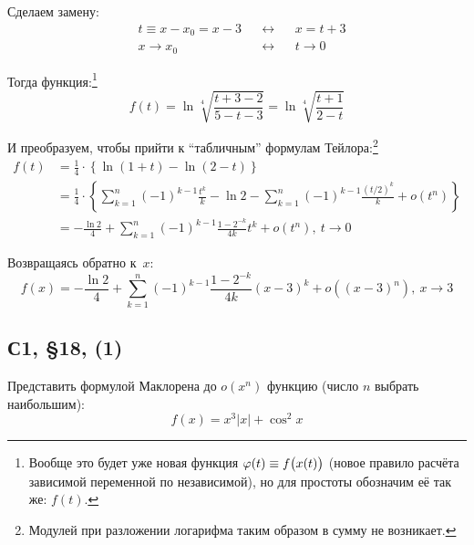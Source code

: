 \documentclass[a4paper,12pt]{article}
\begin{document}
  \begin{solution}
    Сделаем замену:
    \[
      \begin{aligned}
        &t \equiv x - x_0 = x - 3 & &\leftrightarrow & &x = t + 3\\
        &x \to x_0 & &\leftrightarrow & &t \to 0
      \end{aligned}
    \]
    
    Тогда функция:\footnote{
      Вообще это будет уже новая функция $\phi(t) \hm\equiv f\bigl(x(t)\bigr)$ (новое правило расчёта зависимой переменной по независимой), но для простоты обозначим её так же: $f(t)$.
    }
    \[
      f(t) = \ln{\sqrt[4]{\frac{t + 3 - 2}{5 - t - 3}}}
        = \ln{\sqrt[4]{\frac{t + 1}{2 - t}}}
    \]
    
    И преобразуем, чтобы прийти к ``табличным'' формулам Тейлора:\footnote{
      Модулей при разложении логарифма таким образом в сумму не возникает.
    }
    \begin{equation*}
    \begin{split}
      f(t) &= \frac{1}{4} \cdot \left\{
        \ln{(1 + t)} - \ln{(2 - t)}
      \right\}\\
      &= \frac{1}{4} \cdot \left\{
        \sum_{k = 1}^n (-1)^{k - 1} \frac{t^k}{k} - \ln 2 - \sum_{k = 1}^n (-1)^{k - 1} \frac{(t/2)^k}{k} + o(t^n)
      \right\}\\
      &= -\frac{\ln 2}{4} + \sum_{k = 1}^n (-1)^{k - 1} \frac{1 - 2^{-k}}{4k} t^k + o(t^n),\ t \to 0
    \end{split}
    \end{equation*}
    
    Возвращаясь обратно к~$x$:
    \[
      f(x) = -\frac{\ln 2}{4} + \sum_{k = 1}^n (-1)^{k - 1} \frac{1 - 2^{-k}}{4k} (x - 3)^k + o((x - 3)^n),\ x \to 3
    \]
  \end{solution}
  
  
  
  \subsection{С1, \S 18, (1)}
  
  Представить формулой Маклорена до $o(x^n)$ функцию (число $n$ выбрать наибольшим):
  \[
    f(x) = x^3 |x| + \cos^2 x
  \]
  
\end{document}
